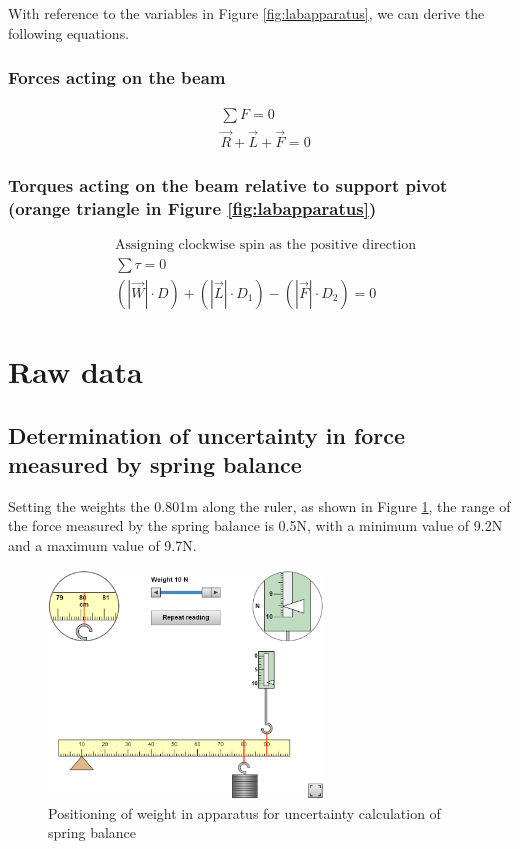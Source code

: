 \documentclass[letterpaper, 12pt]{article}
\begin{document}
With reference to the variables in Figure \ref*{fig:labapparatus}, we can derive the following equations.

\subsubsection*{Forces acting on the beam}
\begin{align*}
     & \sum F                      = 0
    \\
     & \vec{R} + \vec{L} + \vec{F} = 0
\end{align*}

\subsubsection*{Torques acting on the beam relative to support pivot (orange triangle in Figure \ref*{fig:labapparatus})}

\begin{align*}
     & \text{Assigning clockwise spin as the positive direction}
    \\
     & \sum \tau = 0
    \\
     & \left(\left|\vec{W}\right|\cdot D\right) + \left(\left|\vec{L}\right|\cdot D_1\right) - \left(\left|\vec{F}\right|\cdot D_2\right) = 0
\end{align*}

\section{Raw data}

\subsection{Determination of uncertainty in force measured by spring balance}

Setting the weights the 0.801\unit{m} along the ruler, as shown in Figure
\ref*{fig:uncRef}, the range of the force measured by the spring balance is
0.5\unit{N}, with a minimum value of 9.2\unit{N} and a maximum value of
9.7\unit{N}.

\begin{figure}[H]
    \centering
    \includegraphics[width=0.65\textwidth]{uncRef}
    \caption{Positioning of weight in apparatus for uncertainty calculation of spring balance}
    \label{fig:uncRef}
\end{figure}
\end{document}
